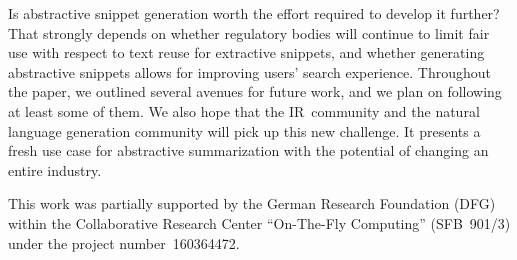 \documentclass[sigconf]{acmart}
\begin{document}
Is abstractive snippet generation worth the effort required to develop it further? That strongly depends on whether regulatory bodies will continue to limit fair use with respect to text reuse for extractive snippets, and whether generating abstractive snippets allows for improving users' search experience. Throughout the paper, we outlined several avenues for future work, and we plan on following at least some of them. We also hope that the IR~community and the natural language generation community will pick up this new challenge. It presents a fresh use case for abstractive summarization with the potential of changing an entire industry.


\begin{acks}
This work was partially supported by the German Research Foundation (DFG) within the Collaborative Research Center ``On-The-Fly Computing'' (SFB~901/3) under the project number~160364472.
\end{acks} 
\end{document}
